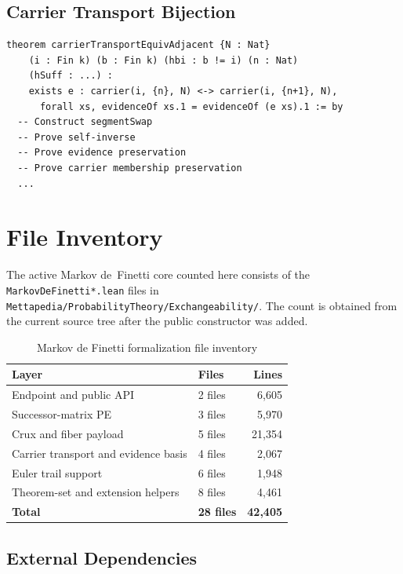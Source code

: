 \documentclass[11pt,a4paper]{article}
\theoremstyle{definition}
\begin{document}
\subsection{Carrier Transport Bijection}

\begin{lstlisting}
theorem carrierTransportEquivAdjacent {N : Nat}
    (i : Fin k) (b : Fin k) (hbi : b != i) (n : Nat)
    (hSuff : ...) :
    exists e : carrier(i, {n}, N) <-> carrier(i, {n+1}, N),
      forall xs, evidenceOf xs.1 = evidenceOf (e xs).1 := by
  -- Construct segmentSwap
  -- Prove self-inverse
  -- Prove evidence preservation
  -- Prove carrier membership preservation
  ...
\end{lstlisting}

\section{File Inventory}

The active Markov de~Finetti core counted here consists of the
\texttt{MarkovDeFinetti*.lean} files in
\texttt{Mettapedia/ProbabilityTheory/Exchangeability/}. The count is obtained
from the current source tree after the public constructor was added.

\begin{table}[h]
\centering
\begin{tabular}{llr}
\toprule
\textbf{Layer} & \textbf{Files} & \textbf{Lines} \\
\midrule
Endpoint and public API & 2 files & 6,605 \\
Successor-matrix PE & 3 files & 5,970 \\
Crux and fiber payload & 5 files & 21,354 \\
Carrier transport and evidence basis & 4 files & 2,067 \\
Euler trail support & 6 files & 1,948 \\
Theorem-set and extension helpers & 8 files & 4,461 \\
\midrule
\textbf{Total} & \textbf{28 files} & \textbf{42,405} \\
\bottomrule
\end{tabular}
\caption{Markov de Finetti formalization file inventory}
\end{table}

\subsection{External Dependencies}
\end{document}
